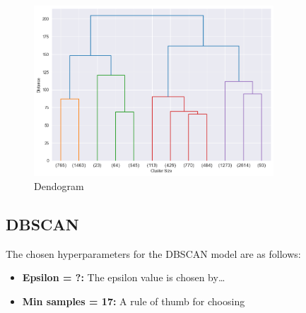 \begin{figure}[H]
    \centering
    \includegraphics[width=0.8\textwidth]{src/figs/dendogram.png} 
    \caption{Dendogram}\label{fig:dendogram}
\end{figure}

\subsection{DBSCAN}

The chosen hyperparameters for the DBSCAN model are as follows:

\begin{itemize}
    \item \textbf{Epsilon = ?:} The epsilon value is chosen by\dots
    \item \textbf{Min samples = 17:} A rule of thumb for choosing 
\end{itemize}